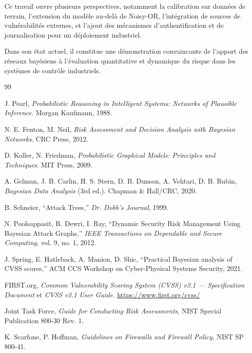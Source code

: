 \documentclass[12pt,a4paper]{article}
\begin{document}
Ce travail ouvre plusieurs perspectives, notamment la calibration sur données de terrain, l'extension du modèle au-delà de Noisy-OR, l'intégration de sources de vulnérabilités externes, et l'ajout des mécanismes d'authentification et de journalisation pour un déploiement industriel.

Dans son état actuel, il constitue une démonstration convaincante de l'apport des réseaux bayésiens à l'évaluation quantitative et dynamique du risque dans les systèmes de contrôle industriels.

\begin{thebibliography}{99}

J. Pearl, \emph{Probabilistic Reasoning in Intelligent Systems: Networks of Plausible Inference}. Morgan Kaufmann, 1988.

N. E. Fenton, M. Neil, \emph{Risk Assessment and Decision Analysis with Bayesian Networks}. CRC Press, 2012.

D. Koller, N. Friedman, \emph{Probabilistic Graphical Models: Principles and Techniques}. MIT Press, 2009.

A. Gelman, J. B. Carlin, H. S. Stern, D. B. Dunson, A. Vehtari, D. B. Rubin, \emph{Bayesian Data Analysis} (3rd ed.). Chapman \& Hall/CRC, 2020.

B. Schneier, ``Attack Trees,'' \emph{Dr. Dobb's Journal}, 1999.

N. Poolsappasit, R. Dewri, I. Ray, ``Dynamic Security Risk Management Using Bayesian Attack Graphs,'' \emph{IEEE Transactions on Dependable and Secure Computing}, vol. 9, no. 1, 2012.

J. Spring, E. Hatleback, A. Manion, D. Shic, ``Practical Bayesian analysis of CVSS scores,'' ACM CCS Workshop on Cyber-Physical Systems Security, 2021.

FIRST.org, \emph{Common Vulnerability Scoring System (CVSS) v3.1 --- Specification Document} et \emph{CVSS v3.1 User Guide}. \url{https://www.first.org/cvss/}

Joint Task Force, \emph{Guide for Conducting Risk Assessments}, NIST Special Publication 800-30 Rev. 1.

K. Scarfone, P. Hoffman, \emph{Guidelines on Firewalls and Firewall Policy}, NIST SP 800-41.


\end{thebibliography}
\end{document}
